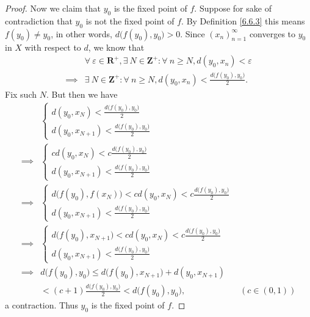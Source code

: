 \begin{proof}
    Now we claim that \(y_0\) is the fixed point of \(f\).
    Suppose for sake of contradiction that \(y_0\) is not the fixed point of \(f\).
    By Definition \ref{6.6.3} this means \(f(y_0) \neq y_0\), in other words, \(d\big(f(y_0), y_0\big) > 0\).
    Since \((x_n)_{n = 1}^\infty\) converges to \(y_0\) in \(X\) with respect to \(d\), we know that
    \begin{align*}
                 & \forall\ \varepsilon \in \mathbf{R}^+, \exists\ N \in \mathbf{Z}^+ : \forall\ n \geq N, d(y_0, x_n) < \varepsilon \\
        \implies & \exists\ N \in \mathbf{Z}^+ : \forall\ n \geq N, d(y_0, x_n) < \frac{d\big(f(y_0), y_0\big)}{2}.
    \end{align*}
    Fix such \(N\).
    But then we have
    \begin{align*}
                 & \begin{cases}
            d(y_0, x_N) < \frac{d\big(f(y_0), y_0\big)}{2} \\
            d(y_0, x_{N + 1}) < \frac{d\big(f(y_0), y_0\big)}{2}
        \end{cases}                                                                    \\
        \implies & \begin{cases}
            c d(y_0, x_N) < c \frac{d\big(f(y_0), y_0\big)}{2} \\
            d(y_0, x_{N + 1}) < \frac{d\big(f(y_0), y_0\big)}{2}
        \end{cases}                                                                    \\
        \implies & \begin{cases}
            d\big(f(y_0), f(x_N)\big) < c d(y_0, x_N) < c \frac{d\big(f(y_0), y_0\big)}{2} \\
            d(y_0, x_{N + 1}) < \frac{d\big(f(y_0), y_0\big)}{2}
        \end{cases}                                                                    \\
        \implies & \begin{cases}
            d\big(f(y_0), x_{N + 1}\big) < c d(y_0, x_N) < c \frac{d\big(f(y_0), y_0\big)}{2} \\
            d(y_0, x_{N + 1}) < \frac{d\big(f(y_0), y_0\big)}{2}
        \end{cases}                                                                    \\
        \implies & d\big(f(y_0), y_0\big) \leq d\big(f(y_0), x_{N + 1}\big) + d(y_0, x_{N + 1})                  \\
                 & < (c + 1) \frac{d\big(f(y_0), y_0\big)}{2} < d\big(f(y_0), y_0\big),         & (c \in (0, 1))
    \end{align*}
    a contraction.
    Thus \(y_0\) is the fixed point of \(f\).
\end{proof}

